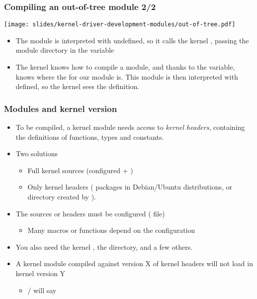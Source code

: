 \begin{frame}
  \frametitle{Compiling an out-of-tree module 2/2}
  \begin{center}
    \texttt{[image: slides/kernel-driver-development-modules/out-of-tree.pdf]}
  \end{center}
  \begin{itemize}
  \item The module  is interpreted with 
    undefined, so it calls the kernel , passing the module
    directory in the  variable
  \item The kernel  knows how to compile a module, and thanks
    to the  variable, knows where the  for our module
    is. This module  is then interpreted with 
    defined, so the kernel sees the  definition.
  \end{itemize}
\end{frame}

\begin{frame}[fragile]
  \frametitle{Modules and kernel version}
  \begin{itemize}
  \item To be compiled, a kernel module needs access to {\em kernel
    headers}, containing the definitions of functions, types and
    constants.
  \item Two solutions
    \begin{itemize}
    \item Full kernel sources
      (configured + )
    \item Only kernel headers ( packages in
      Debian/Ubuntu distributions, or directory created by ).
    \end{itemize}
  \item The sources or headers must be configured ( file)
    \begin{itemize}
    \item Many macros or functions depend on the configuration
    \end{itemize}
  \item You also need the kernel , the 
        directory, and a few others.
  \item A kernel module compiled against version X of kernel headers
    will not load in kernel version Y
    \begin{itemize}
    \item {} /  will say 
    \end{itemize}
  \end{itemize}
\end{frame}

